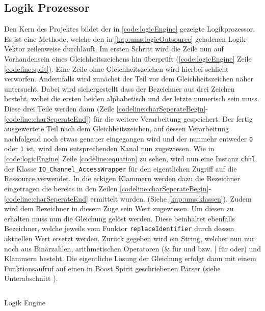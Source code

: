 \subsection{Logik Prozessor}\label{kap:ums:logicProcessor}
Den Kern des Projektes bildet der in \autoref{code:logicEngine} gezeigte Logikprozessor. Es ist eine Methode, welche den in \autoref{kap:ums:logicOutsource} geladenen Logik-Vektor zeilenweise durchläuft. Im ersten Schritt wird die Zeile nun auf Vorhandensein eines Gleichheitszeichens hin überprüft (\autoref{code:logicEngine} Zeile \ref{codeline:split}). Eine Zeile ohne Gleichheitszeichen wird hierbei schlicht verworfen. Andernfalls wird zunächst der Teil vor dem Gleichheitszeichen näher untersucht. Dabei wird sichergestellt dass der Bezeichner aus drei Zeichen besteht, wobei die ersten beiden alphabetisch und der letzte numerisch sein muss. Diese drei Teile werden dann (Zeile \ref{codeline:charSeperateBegin}-\ref{codeline:charSeperateEnd}) für die weitere Verarbeitung gespeichert. Der fertig ausgewertete Teil nach dem Gleichheitszeichen, auf dessen Verarbeitung nachfolgend noch etwas genauer eingegangen wird und der nunmehr entweder \texttt{0} oder \texttt{1} ist, wird dem entsprechenden Kanal nun zugewiesen. Wie in \autoref{code:logicEngine} Zeile \ref{codeline:equation} zu sehen, wird nun eine Instanz \texttt{chnl} der Klasse \texttt{IO\_Channel\_AccessWrapper} für den eigentlichen Zugriff auf die Ressource verwendet. In die eckigen Klammern werden dazu die Bezeichner eingetragen die bereits in den Zeilen \ref{codeline:charSeperateBegin}-\ref{codeline:charSeperateEnd} ermittelt wurden. (Siehe \autoref{kap:ums:klassen}). 
Zudem wird dem Bezeichner in diesem Zuge sein Wert zugewiesen. Um diesen zu erhalten muss nun die Gleichung gelöst werden. Diese beinhaltet ebenfalls Bezeichner, welche jeweils vom Funktor \texttt{replaceIdentifier} durch dessen aktuellen Wert ersetzt werden. Zurück gegeben wird ein String, welcher nun nur noch aus Binärzahlen, arithmetischen Operatoren (\& für und bzw. | für oder) und Klammern besteht. Die eigentliche Lösung der Gleichung erfolgt dann mit einem Funktionsaufruf auf einen in Boost Spirit geschriebenen Parser (siehe Unterabschnitt ). 
\begin{listing}[H]

	\inputminted[numbersep=1pt,linenos=true, mathescape, numbers=left, fontsize=\scriptsize,frame=single, firstline=186,lastline=222]{c}{./code/main-klassenstruktur.cpp}
	\caption{Logik Engine}
	\label{code:logicEngine}
\end{listing}
